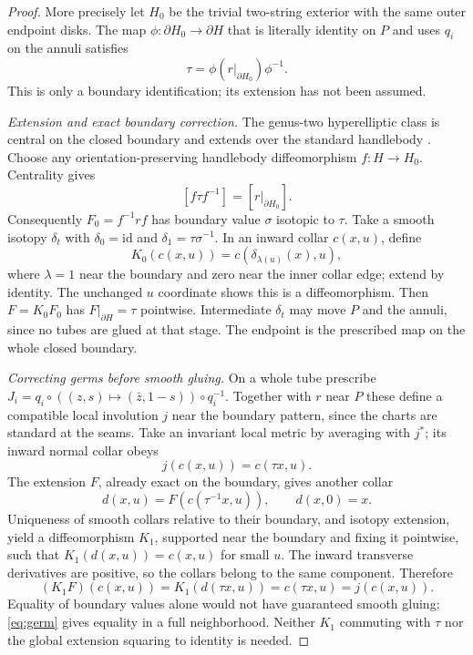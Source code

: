 \documentclass[11pt]{article}
\theoremstyle{remark}\newtheorem{remark}[theorem]{Remark}
\newcommand{\id}{\mathrm{id}}
\begin{document}
\begin{proof}
More precisely let $H_0$ be the trivial two-string exterior with the
same outer endpoint disks. The map $\phi:\partial H_0\to\partial H$ that
is literally identity on $P$ and uses $q_i$ on the annuli satisfies
\[
\tau=\phi(r|_{\partial H_0})\phi^{-1}.
\]
This is only a boundary identification; its extension has not been assumed.

\emph{Extension and exact boundary correction.}
The genus-two hyperelliptic class is central on the closed boundary and
extends over the standard handlebody
\cite[\S2, pp.~491--492]{RS}\cite[p.~272]{BM}.
Choose any orientation-preserving handlebody diffeomorphism $f:H\to H_0$.
Centrality gives
\[
[f\tau f^{-1}]=[r|_{\partial H_0}].
\]
Consequently $F_0=f^{-1}rf$ has boundary value $\sigma$ isotopic to $\tau$.
Take a smooth isotopy $\delta_t$ with $\delta_0=\id$ and
$\delta_1=\tau\sigma^{-1}$. In an inward collar $c(x,u)$, define
\[
K_0(c(x,u))=c(\delta_{\lambda(u)}(x),u),
\]
where $\lambda=1$ near the boundary and zero near the inner collar edge;
extend by identity. The unchanged $u$ coordinate shows this is a
diffeomorphism. Then $F=K_0F_0$ has $F|_{\partial H}=\tau$ pointwise.
Intermediate $\delta_t$ may move $P$ and the annuli, since no tubes are
glued at that stage. The endpoint is the prescribed map on the whole
closed boundary.

\emph{Correcting germs before smooth gluing.}
On a whole tube prescribe
$J_i=q_i\circ((z,s)\mapsto(\bar z,1-s))\circ q_i^{-1}$.
Together with $r$ near $P$ these define a compatible local involution $j$
near the boundary pattern, since the charts are standard at the seams.
Take an invariant local metric by averaging with $j^*$; its inward normal
collar obeys
\[
j(c(x,u))=c(\tau x,u).
\]
The extension $F$, already exact on the boundary, gives another collar
\[
d(x,u)=F(c(\tau^{-1}x,u)),\qquad d(x,0)=x.
\]
Uniqueness of smooth collars relative to their boundary, and isotopy
extension, yield a diffeomorphism $K_1$, supported near the boundary and
fixing it pointwise, such that $K_1(d(x,u))=c(x,u)$ for small $u$.
The inward transverse derivatives are positive, so the collars belong
to the same component. Therefore
\begin{equation}\label{eq:germ}
(K_1F)(c(x,u))=K_1(d(\tau x,u))=c(\tau x,u)=j(c(x,u)).
\end{equation}
Equality of boundary values alone would not have guaranteed smooth gluing;
\eqref{eq:germ} gives equality in a full neighborhood. Neither $K_1$
commuting with $\tau$ nor the global extension squaring to identity is needed.


\end{proof}
\end{document}
